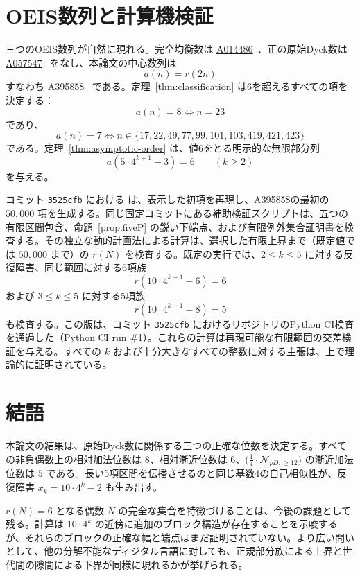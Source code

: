 \documentclass[12pt]{ltjsarticle}
\theoremstyle{plain}
\theoremstyle{definition}
\theoremstyle{plain}
\newcommand{\Pset}{
  \bigl(\tfrac{1}{4}\cdot\mathcal{N}_{pD,\geq 12}\bigr)
}
\newcommand{\seqnum}[1]{\href{https://oeis.org/#1}{\textrm{\underline{#1}}}}
\begin{document}
\section{OEIS数列と計算機検証}
\label{sec:oeis}

三つのOEIS数列が自然に現れる。完全均衡数は \seqnum{A014486}~\cite{OEIS-A014486}、正の原始Dyck数は \seqnum{A057547}~\cite{OEIS-A057547} をなし、本論文の中心数列は
\[
  a(n)=r(2n)
\]
すなわち \seqnum{A395858}~\cite{OEIS-A395858} である。定理~\ref{thm:classification} は6を超えるすべての項を決定する：
\[
  a(n)=8\iff n=23
\]
であり、
\[
  a(n)=7\iff
  n\in\{17,22,49,77,99,101,103,419,421,423\}
\]
である。定理~\ref{thm:asymptotic-order} は、値6をとる明示的な無限部分列
\begin{equation}\label{eq:A395858-six-subsequence}
  a(5\cdot4^{k+1}-3)=6\qquad(k\geq2)
\end{equation}
を与える。

\href{https://github.com/growupkuriyama-hub/lean_cfg_project/blob/3525cfb/LeanCfgProject/PrimDyck/A395858.py}{コミット \texttt{3525cfb} における }
は、表示した初項を再現し、A395858の最初の $50{,}000$ 項を生成する。同じ固定コミットにある補助検証スクリプトは、五つの有限区間包含、命題~\ref{prop:fiveP} の鋭い下端点、および有限例外集合証明書を検査する。その独立な動的計画法による計算は、選択した有限上界まで（既定値では $50{,}000$ まで）の $r(N)$ を検査する。既定の実行では、$2\leq k\leq5$ に対する反復障害、同じ範囲に対する6項族
\[
 r(10\cdot4^{k+1}-6)=6
\]
および $3\leq k\leq5$ に対する5項族
\[
 r(10\cdot4^{k+1}-8)=5
\]
も検査する。この版は、コミット \texttt{3525cfb} におけるリポジトリのPython CI検査を通過した（Python CI run \#1）。これらの計算は再現可能な有限範囲の交差検証を与える。すべての $k$ および十分大きなすべての整数に対する主張は、上で理論的に証明されている。

\section{結語}

本論文の結果は、原始Dyck数に関係する三つの正確な位数を決定する。すべての非負偶数上の相対加法位数は $8$、相対漸近位数は $6$、$\Pset$ の漸近加法位数は $5$ である。長い5項区間を伝播させるのと同じ基数4の自己相似性が、反復障害 $x_k=10\cdot4^k-2$ も生み出す。

$r(N)=6$ となる偶数 $N$ の完全な集合を特徴づけることは、今後の課題として残る。計算は $10\cdot4^k$ の近傍に追加のブロック構造が存在することを示唆するが、それらのブロックの正確な幅と端点はまだ証明されていない。より広い問いとして、他の分解不能なディジタル言語に対しても、正規部分族による上界と世代間の隙間による下界が同様に現れるかが挙げられる。
\end{document}
